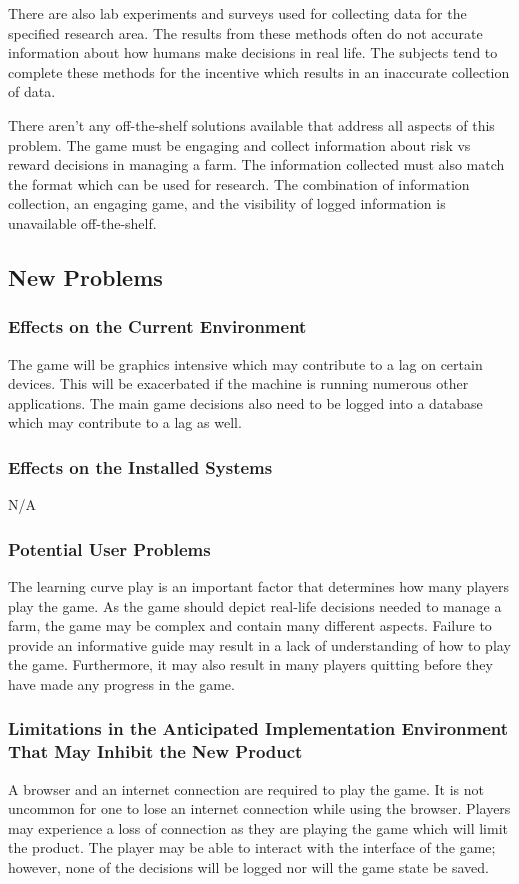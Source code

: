 \documentclass{article}
\begin{document}
There are also lab experiments and surveys used for collecting data for the specified research area. The results from these methods often do not accurate information about how humans make decisions in real life. The subjects tend to complete these methods for the incentive which results in an inaccurate collection of data.

There aren't any off-the-shelf solutions available that address all aspects of this problem. The game must be engaging and collect information about risk vs reward decisions in managing a farm. The information collected must also match the format which can be used for research. The combination of information collection, an engaging game, and the visibility of logged information is unavailable off-the-shelf.

\subsection{New Problems}
\subsubsection{Effects on the Current Environment}
The game will be graphics intensive which may contribute to a lag on certain devices. This will be exacerbated if the machine is running numerous other applications. The main game decisions also need to be logged into a database which may contribute to a lag as well.

\subsubsection{Effects on the Installed Systems}
N/A

\subsubsection{Potential User Problems}
The learning curve play is an important factor that determines how many players play the game. As the game should depict real-life decisions needed to manage a farm, the game may be complex and contain many different aspects. Failure to provide an informative guide may result in a lack of understanding of how to play the game. Furthermore, it may also result in many players quitting before they have made any progress in the game.


\subsubsection{Limitations in the Anticipated Implementation Environment That May Inhibit the New Product}
A browser and an internet connection are required to play the game. It is not uncommon for one to lose an internet connection while using the browser. Players may experience a loss of connection as they are playing the game which will limit the product. The player may be able to interact with the interface of the game; however, none of the decisions will be logged nor will the game state be saved.
\end{document}
